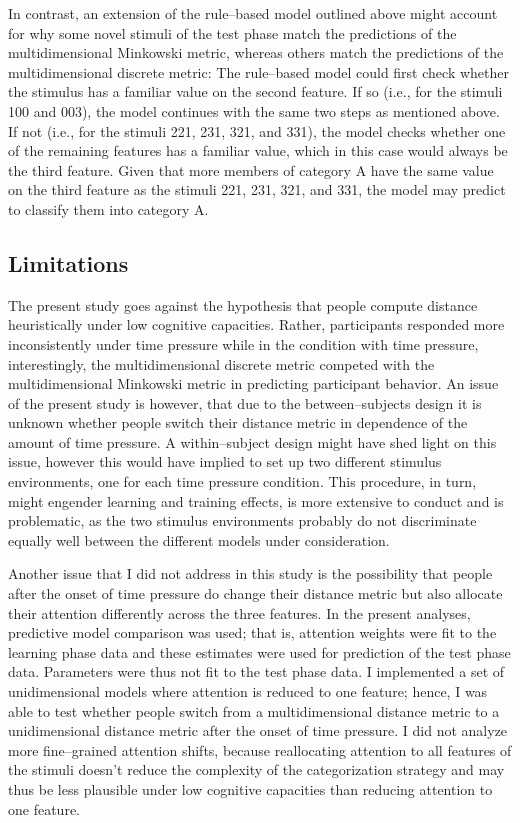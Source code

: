 \documentclass[a4paper,man,natbib]{apa6}
\begin{document}
In contrast, an extension of the rule--based model outlined above might account for why some novel stimuli of the test phase match the predictions of the multidimensional Minkowski metric, whereas others match the predictions of the multidimensional discrete metric: The rule--based model could first check whether the stimulus has a familiar value on the second feature. If so (i.e., for the stimuli 100 and 003), the model continues with the same two steps as mentioned above. If not (i.e., for the stimuli 221, 231, 321, and 331), the model checks whether one of the remaining features has a familiar value, which in this case would always be the third feature. Given that more members of category A have the same value on the third feature as the stimuli 221, 231, 321, and 331, the model may predict to classify them into category A. 

\subsection{Limitations}
The present study goes against the hypothesis that people compute distance heuristically under low cognitive capacities. Rather, participants responded more inconsistently under time pressure while in the condition with time pressure, interestingly, the multidimensional discrete metric competed with the multidimensional Minkowski metric in predicting participant behavior. An issue of the present study is however, that due to the between--subjects design it is unknown whether people switch their distance metric in dependence of the amount of time pressure. A within--subject design might have shed light on this issue, however this would have implied to set up two different stimulus environments, one for each time pressure condition. This procedure, in turn, might engender learning and training effects, is more extensive to conduct and is problematic, as the two stimulus environments probably do not discriminate equally well between the different models under consideration.

Another issue that I did not address in this study is the possibility that people after the onset of time pressure do change their distance metric but also allocate their attention differently across the three features. In the present analyses, predictive model comparison was used; that is, attention weights were fit to the learning phase data and these estimates were used for prediction of the test phase data. Parameters were thus not fit to the test phase data. I implemented a set of unidimensional models where attention is reduced to one feature; hence, I was able to test whether people switch from a multidimensional distance metric to a unidimensional distance metric after the onset of time pressure. I did not analyze more fine--grained attention shifts, because reallocating attention to all features of the stimuli doesn't reduce the complexity of the categorization strategy and may thus be less plausible under low cognitive capacities than reducing attention to one feature. 
\end{document}
